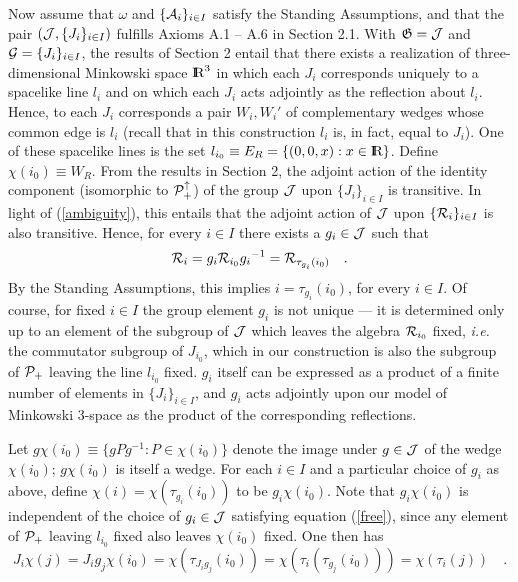 \documentclass[a4paper,twoside,12pt]{article}
\def\inet{{\{\As_i \}_{i \in I}}}
\def\irnet{{\{\Rs_i \}_{i \in I}}}
\def\As{{\cal A}}
\def\Gs{{\cal G}}
\def\Js{{\cal J}}
\def\Ps{{\cal P}}
\def\Rs{{\cal R}}
\def\Pid{{\Ps_+ ^{\uparrow}}}
\def\RR{\textnormal{{\rm I \hskip -5.75pt R}}}
\def\Pid{{\Ps_+ ^{\uparrow}}}
\begin{document}
     Now assume that $\omega$ and $\inet$ satisfy the Standing Assumptions, 
and that the pair $(\Js,\{ J_i \}_{i \in I})$ fulfills Axioms A.1 -- A.6 
in Section 2.1. With $\mathfrak{G} = \Js$ and $\Gs = \{ J_i \}_{i \in I}$,
the results of Section 2 entail that there exists a realization of
three-dimensional Minkowski space $\RR^3$ in which each $J_i$ corresponds
uniquely to a spacelike line $l_i$ and on which each $J_i$ acts 
adjointly as the reflection about $l_i$. Hence, to each $J_i$ corresponds a 
pair $W_i,W_i{}'$ of complementary wedges whose common edge is $l_i$
(recall that in this construction $l_i$ is, in fact, equal to $J_i$). 
One of these spacelike lines is the set 
$l_{i_0} \equiv E_R = \{ (0,0,x) : x \in \RR \}$. Define 
$\chi(i_0) \equiv W_R$. 
From the results in Section 2, the adjoint action of the identity
component (isomorphic to $\Pid$) of the group $\Js$ 
upon $\{ J_i \}_{i \in I}$ is transitive. In light of (\ref{ambiguity}),
this entails that the adjoint action of $\Js$ upon $\irnet$ is also
transitive. Hence, for every $i \in I$ there exists a $g_i \in \Js$ such that 
%
\begin{equation}
\Rs_i = g_i \Rs_{i_0} g_i{}^{-1} = \Rs_{\tau_{g_i}(i_0)} \quad . \label{free}
\end{equation}
%
By the Standing Assumptions, this implies $i = \tau_{g_i}(i_0)$, for
every $i \in I$. Of course, for fixed $i \in I$ the group element 
$g_i$ is not unique --- it is determined only up to an element 
of the subgroup of $\Js$ which leaves the algebra $\Rs_{i_0}$ fixed, 
{\it i.e.} the commutator subgroup of $J_{i_0}$, which in our construction
is also the subgroup of $\Ps_+$ leaving the line $l_{i_0}$ fixed. 
$g_i$ itself can be expressed as a product of a finite number of elements in 
$\{ J_i \}_{i \in I}$, and $g_i$ acts adjointly upon our model of 
Minkowski 3-space as the product of the corresponding reflections.

     Let $g\chi(i_0) \equiv \{ gPg^{-1} : P \in \chi(i_0)\}$ denote the 
image under $g \in \Js$ of the wedge $\chi(i_0)$; $g\chi(i_0)$ is itself 
a wedge. For each $i \in I$ and a particular choice of $g_i$ as above, define 
$\chi(i) = \chi(\tau_{g_i}(i_0))$ to be $g_i \chi(i_0)$. Note that
$g_i \chi(i_0)$ is independent of the choice of $g_i \in \Js$ satisfying
equation (\ref{free}), since any element of $\Ps_+$ leaving $l_{i_0}$
fixed also leaves $\chi(i_0)$ fixed. 
One then has
%
\begin{equation}
J_i \chi(j) = J_i g_j \chi(i_0) = \chi(\tau_{J_i g_j}(i_0)) =
\chi(\tau_i(\tau_{g_j}(i_0))) = \chi(\tau_i(j)) \quad . \label{cov}
\end{equation}
%
\end{document}
